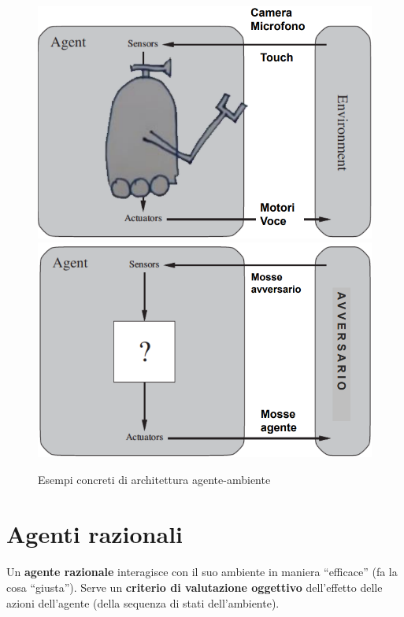 \documentclass[a4paper, 12pt]{report}
\begin{document}
                \begin{figure}[htbp]
                    \centering
                    \includegraphics[scale=0.25]{Media/ArchitetturaRobot.png}
                    \includegraphics[scale=0.25]{Media/ArchitetturaGioco.png}
                    \caption{Esempi concreti di architettura agente-ambiente}
                \end{figure}
        \section{Agenti razionali}
            \paragraph{}Un \textbf{agente razionale} interagisce con il suo ambiente in maniera “efficace” (fa la cosa “giusta”).
            Serve un \textbf{criterio di valutazione oggettivo} dell’effetto delle azioni dell’agente (della sequenza di stati dell’ambiente).
\end{document}
